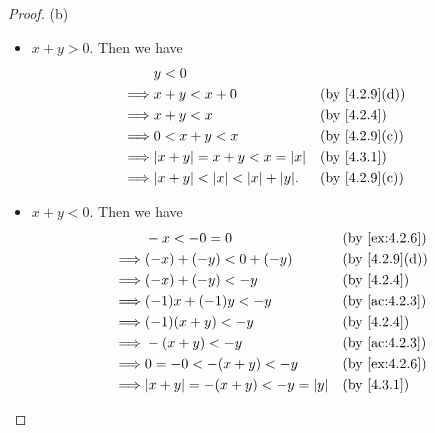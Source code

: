\begin{proof}{(b)}
\begin{itemize}
\begin{itemize}
\begin{itemize}
                    \item \(x + y > 0\).
                          Then we have
                          \begin{align*}
                                     & y < 0                                                                       \\
                            \implies & x + y < x + 0                              &  & \text{(by \cref{4.2.9}(d))} \\
                            \implies & x + y < x                                  &  & \by{4.2.4}                  \\
                            \implies & 0 < x + y < x                              &  & \text{(by \cref{4.2.9}(c))} \\
                            \implies & \abs{x + y} = x + y < x = \abs{x}          &  & \by{4.3.1}                  \\
                            \implies & \abs{x + y} < \abs{x} < \abs{x} + \abs{y}. &  & \text{(by \cref{4.2.9}(c))}
                          \end{align*}
                    \item \(x + y < 0\).
                          Then we have
                          \begin{align*}
                                     & -x < -0 = 0                                &  & \text{(by \cref{ex:4.2.6})} \\
                            \implies & (-x) + (-y) < 0 + (-y)                     &  & \text{(by \cref{4.2.9}(d))} \\
                            \implies & (-x) + (-y) < -y                           &  & \by{4.2.4}                  \\
                            \implies & (-1)x + (-1)y < -y                         &  & \text{(by \cref{ac:4.2.3})} \\
                            \implies & (-1)(x + y) < -y                           &  & \by{4.2.4}                  \\
                            \implies & -(x + y) < -y                              &  & \text{(by \cref{ac:4.2.3})} \\
                            \implies & 0 = -0 < -(x + y) < -y                     &  & \text{(by \cref{ex:4.2.6})} \\
                            \implies & \abs{x + y} = -(x + y) < -y = \abs{y}      &  & \by{4.3.1}                  \\

\end{align*}
\end{itemize}
\end{itemize}
\end{itemize}
\end{proof}
